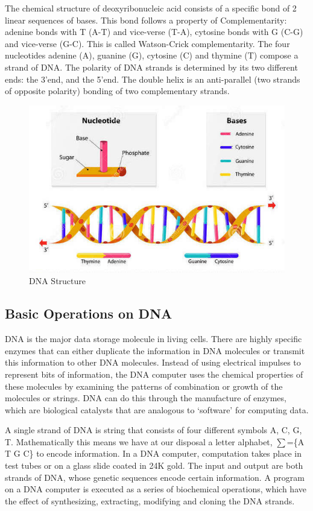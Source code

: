 The chemical structure of deoxyribonucleic acid consists of a specific bond of 2 linear sequences of bases. This bond follows a property of Complementarity: adenine bonds with T (A-T) and vice-verse (T-A), cytosine bonds with G (C-G) and vice-verse (G-C). This is called Watson-Crick complementarity.
The four nucleotides adenine (A), guanine (G), cytosine (C) and thymine (T) compose a strand of DNA. The polarity of DNA strands is determined by its two different ends: the 3’end, and the 5’end. The double helix is an anti-parallel (two strands of opposite polarity) bonding of two complementary strands.

\begin{figure}[h!]
  \centering
  \includegraphics[width=\textwidth]{images/dna}
  \caption{DNA Structure}
\end{figure}
 
\subsection{Basic Operations on DNA}
DNA is the major data storage molecule in living cells. There are highly  specific  enzymes  that  can  either duplicate the information in DNA molecules or transmit this information to other DNA molecules. Instead of using electrical impulses to represent bits of  information, the  DNA  computer  uses  the  chemical  properties  of these  molecules by  examining  the  patterns  of  combination  or  growth  of the  molecules or  strings.  DNA  can  do  this  through  the  manufacture  of enzymes, which   are   biological   catalysts that are analogous to `software' for computing data.

A single strand of DNA is string that consists of four different symbols A, C, G, T. Mathematically this means we have at our disposal a  letter alphabet, $\sum$=\{A T G C\} to encode information. In a DNA computer, computation takes place in test tubes or on a glass slide coated in 24K gold. The input and output  are  both strands  of  DNA,  whose  genetic  sequences  encode certain  information. A  program  on  a  DNA  computer  is  executed  as  a series  of  biochemical operations,  which  have  the  effect  of  synthesizing, extracting, modifying and cloning the DNA strands.
\\ \\

